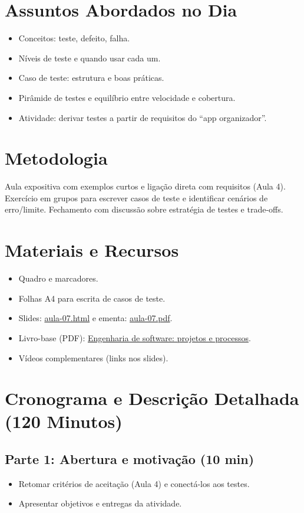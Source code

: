 \documentclass[12pt,a4paper]{article}
\begin{document}
\section{Assuntos Abordados no Dia}
\begin{itemize}[leftmargin=*,itemsep=0.25em]
  \item Conceitos: teste, defeito, falha.
  \item Níveis de teste e quando usar cada um.
  \item Caso de teste: estrutura e boas práticas.
  \item Pirâmide de testes e equilíbrio entre velocidade e cobertura.
  \item Atividade: derivar testes a partir de requisitos do ``app organizador''.
\end{itemize}

\section{Metodologia}
Aula expositiva com exemplos curtos e ligação direta com requisitos (Aula 4). Exercício em grupos para escrever casos de teste e identificar cenários de erro/limite. Fechamento com discussão sobre estratégia de testes e trade-offs.

\section{Materiais e Recursos}
\begin{itemize}[leftmargin=*,itemsep=0.25em]
  \item Quadro e marcadores.
  \item Folhas A4 para escrita de casos de teste.
  \item Slides: \href{aula-07.html}{aula-07.html} e ementa: \href{aula-07.pdf}{aula-07.pdf}.
  \item Livro-base (PDF): \href{../99-Materiais/Engenharia%20de%20software%20projetos%20e%20processos%20by%20Wilson%20de%20P%C3%A1dua%20Paula%20Filho%20.epub.pdf}{Engenharia de software: projetos e processos}.
  \item Vídeos complementares (links nos slides).
\end{itemize}

\section{Cronograma e Descrição Detalhada (120 Minutos)}
\subsection*{Parte 1: Abertura e motivação (10 min)}
\begin{itemize}[leftmargin=*,itemsep=0.35em]
  \item Retomar critérios de aceitação (Aula 4) e conectá-los aos testes.
  \item Apresentar objetivos e entregas da atividade.
\end{itemize}
\end{document}

